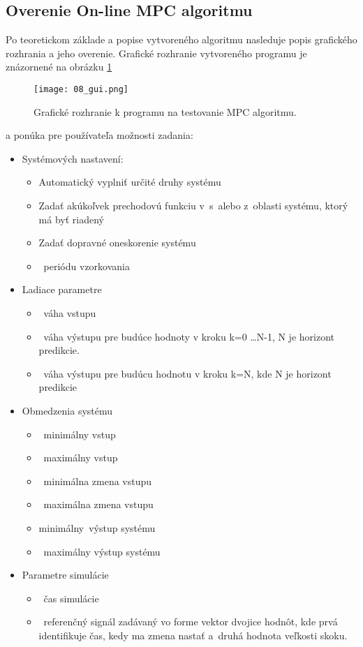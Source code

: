 \subsection{Overenie On-line MPC algoritmu} \label{mpcprogram}
Po teoretickom základe a popise vytvoreného algoritmu nasleduje popis grafického rozhrania a jeho overenie. Grafické rozhranie vytvoreného programu je znázornené na obrázku \ref{08_gui} 

\begin{figure}[h]
\centering
\texttt{[image: 08\_gui.png]}
\caption{Grafické rozhranie k programu na testovanie MPC algoritmu.}
\label{08_gui}
\end{figure}

a ponúka pre používateľa možnosti zadania:

\begin{itemize}
\item
  Systémových nastavení:

  \begin{itemize}
  \item
    Automatický vyplniť určité druhy systému
  \item
    Zadať akúkoľvek prechodovú funkciu v~s~alebo z~oblasti systému,
    ktorý má byť riadený
  \item
    Zadať dopravné oneskorenie systému
  \item
    ~periódu vzorkovania
  \end{itemize}
\item
  Ladiace parametre

  \begin{itemize}
  \item
    ~váha vstupu
  \item
    ~váha výstupu pre budúce hodnoty v kroku k=0 \dots N-1, N je horizont predikcie.
  \item
    ~váha výstupu pre budúcu hodnotu v kroku k=N, kde N je horizont predikcie
  \end{itemize}
\item
  Obmedzenia systému

  \begin{itemize}
  \item
    ~minimálny vstup
  \item
    ~maximálny vstup
  \item
    ~minimálna zmena vstupu
  \item
    ~maximálna zmena vstupu
  \item
    minimálny~výstup systému
  \item
    ~maximálny výstup systému
  \end{itemize}
\item
  Parametre simulácie

  \begin{itemize}
  \item
    ~čas simulácie
  \item
    ~referenčný signál zadávaný vo forme vektor dvojice hodnôt, kde prvá
    identifikuje čas, kedy ma zmena nastať a~druhá hodnota veľkosti
    skoku.
  \end{itemize}
\end{itemize}

